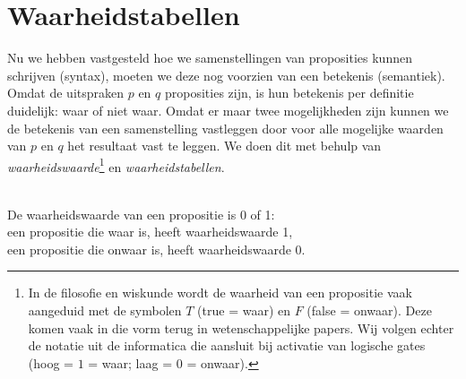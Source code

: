 \section{Waarheidstabellen}\label{sec:wtab}
Nu we hebben vastgesteld hoe we samenstellingen van proposities kunnen schrijven (syntax), moeten we deze nog voorzien van een betekenis (semantiek). Omdat de uitspraken $p$ en $q$ proposities zijn, is hun betekenis per definitie duidelijk: waar of niet waar. Omdat er maar twee mogelijkheden zijn kunnen we de betekenis van een samenstelling vastleggen door voor alle mogelijke waarden van $p$ en $q$ het resultaat vast te leggen. We doen dit met behulp van \textit{waarheidswaarde}\footnote{In de filosofie en wiskunde wordt de waarheid van een propositie vaak aangeduid met de symbolen $T$ (true = waar) en $F$ (false = onwaar). Deze komen vaak in die vorm terug in wetenschappelijke papers. Wij volgen echter de notatie uit de informatica die aansluit bij activatie van logische gates (hoog = $1$ = waar; laag = $0$ = onwaar).} en \textit{waarheidstabellen}.

\begin{definition}[Waarheidswaarde]\mbox{}\\
De waarheidswaarde van een propositie is 0 of 1:\\
\indent een propositie die waar is, heeft waarheidswaarde 1,\\
\indent een propositie die onwaar is, heeft waarheidswaarde 0.
\end{definition}

